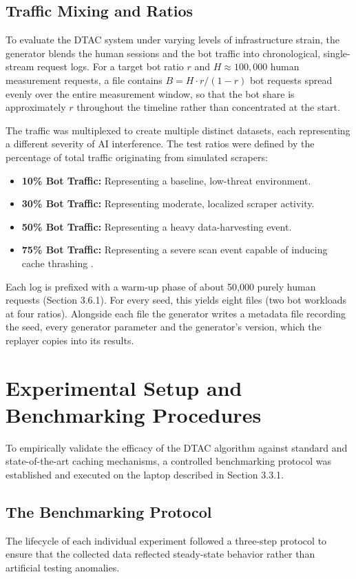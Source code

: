 \subsection{Traffic Mixing and Ratios}
To evaluate the DTAC system under varying levels of infrastructure strain, the generator blends the human sessions and the bot traffic into chronological, single-stream request logs. For a target bot ratio $r$ and $H \approx 100{,}000$ human measurement requests, a file contains $B = H \cdot r / (1 - r)$ bot requests spread evenly over the entire measurement window, so that the bot share is approximately $r$ throughout the timeline rather than concentrated at the start.

The traffic was multiplexed to create multiple distinct datasets, each representing a different severity of AI interference. The test ratios were defined by the percentage of total traffic originating from simulated scrapers:
\begin{itemize}
    \item \textbf{10\% Bot Traffic:} Representing a baseline, low-threat environment.
    \item \textbf{30\% Bot Traffic:} Representing moderate, localized scraper activity.
    \item \textbf{50\% Bot Traffic:} Representing a heavy data-harvesting event.
    \item \textbf{75\% Bot Traffic:} Representing a severe scan event capable of inducing cache thrashing \cite{zhang_rethinking_2026}.
\end{itemize}

Each log is prefixed with a warm-up phase of about 50,000 purely human requests (Section 3.6.1). For every seed, this yields eight files (two bot workloads at four ratios). Alongside each file the generator writes a metadata file recording the seed, every generator parameter and the generator's version, which the replayer copies into its results.

\section{Experimental Setup and Benchmarking Procedures}
To empirically validate the efficacy of the DTAC algorithm against standard and state-of-the-art caching mechanisms, a controlled benchmarking protocol was established and executed on the laptop described in Section 3.3.1.

\subsection{The Benchmarking Protocol}
The lifecycle of each individual experiment followed a three-step protocol to ensure that the collected data reflected steady-state behavior rather than artificial testing anomalies.

